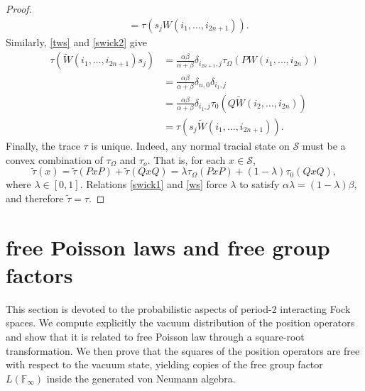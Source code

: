 \documentclass[12pt]{amsart}
\numberwithin{equation}{section}
\theoremstyle{definition}
\begin{document}
\begin{proof}
\begin{align*}
&= \tau(s_j W(i_1, \ldots, i_{2n+1})).
\end{align*}
Similarly, \eqref{tws} and \eqref{swick2} give
\begin{align*}
\tau(\widetilde{W}(i_1, \ldots, i_{2n+1}) s_j)
&= \frac{\alpha \beta}{\alpha + \beta} \delta_{i_{2n+1}, j} \tau_\Omega(P W(i_1, \ldots, i_{2n})) \\
&= \frac{\alpha \beta}{\alpha + \beta} \delta_{n,0} \delta_{i_1, j} \\
&= \frac{\alpha \beta}{\alpha + \beta} \delta_{i_1, j} \tau_0(Q \widetilde{W}(i_2, \ldots, i_{2n})) \\
&= \tau(s_j \widetilde{W}(i_1, \ldots, i_{2n+1})).
\end{align*}
Finally, the trace $\tau$ is unique. Indeed, any normal tracial state on $\mathcal{S}$ must be a convex combination of $\tau_\Omega$ and $\tau_o$. That is, for each $x \in \mathcal{S}$,
\begin{equation*}%
\tilde{\tau}(x) = \tilde{\tau}(PxP) + \tilde{\tau}(QxQ) = \lambda \tau_\Omega(PxP) + (1 - \lambda) \tau_0(QxQ),
\end{equation*}
where $\lambda \in [0, 1]$.
Relations \eqref{swick1} and \eqref{ws} force $\lambda$ to satisfy $\alpha \lambda = (1 - \lambda) \beta$, and therefore $\tilde{\tau} = \tau$.
\end{proof}
\section{free Poisson laws and free group factors}\label{seclaw}
This section is devoted to the probabilistic aspects of period-2 interacting Fock spaces. We compute explicitly the vacuum distribution of the position operators and show that it is related to free Poisson law through a square-root transformation. We then prove that the squares of the position operators are free with respect to the vacuum state, yielding copies of the free group factor $L(\mathbb F_\infty)$ inside the generated von Neumann algebra.\\
\end{document}
